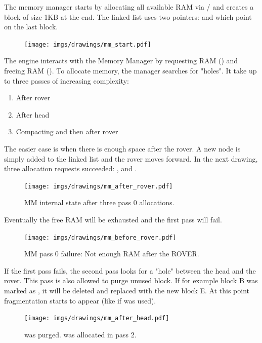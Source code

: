 \documentclass[book.tex]{subfiles}
\begin{document}
The memory manager starts by allocating all available RAM via / and creates a  block of size 1KB at the end. The linked list uses two pointers:  and  which point on the last block.
 \par
\begin{figure}[H]
\centering
 \texttt{[image: imgs/drawings/mm\_start.pdf]}
 \end{figure}
 \par
 The engine interacts with the Memory Manager by requesting RAM () and freeing RAM (). To allocate memory, the manager searches for "holes". It take up to three passes of increasing complexity:
\begin{enumerate}
\item After rover
\item After head
\item Compacting and then after rover
\end{enumerate}
\par
  The easier case is when there is enough space after the rover. A new node is simply added to the linked list and the rover moves forward. In the next drawing, three allocation requests succeeded: ,  and .\\
  \par
\begin{figure}[H]
\centering
 \texttt{[image: imgs/drawings/mm\_after\_rover.pdf]}
 \caption{MM internal state after three pass 0 allocations.}
 \end{figure}
 \par
Eventually the free RAM will be exhausted and the first pass will fail.
  \par
\begin{figure}[H]
\centering
 \texttt{[image: imgs/drawings/mm\_before\_rover.pdf]}
 \caption{MM pass 0 failure: Not enough RAM after the ROVER.}
 \end{figure}
 \par
 If the first pass fails, the second pass looks for a "hole" between the head and the rover. This pass is also allowed to purge unused block. If for example block B was marked as , it will be deleted and replaced with the new block E. At this point fragmentation starts to appear (like if  was used).\\
 \begin{figure}[H]
\centering
 \texttt{[image: imgs/drawings/mm\_after\_head.pdf]}
 \caption{ was purged.  was allocated in pass 2.}
 \end{figure}
\end{document}
